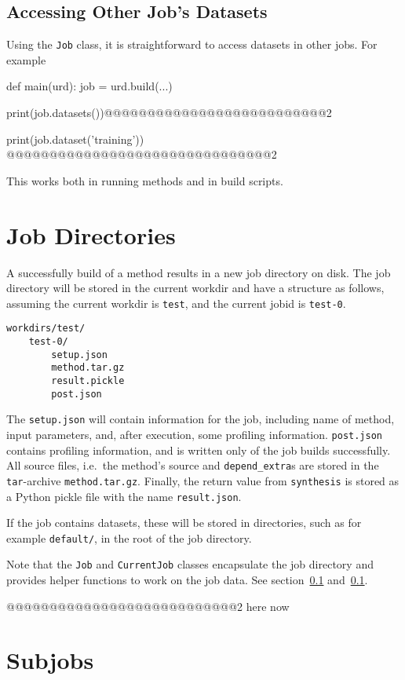 \subsection{Accessing Other Job's Datasets}
Using the \texttt{Job} class, it is straightforward to access datasets
in other jobs.  For example
\begin{python}
def main(urd):
    job = urd.build(...)

    print(job.datasets())@@@@@@@@@@@@@@@@@@@@@@@@@@2

    print(job.dataset('training')) @@@@@@@@@@@@@@@@@@@@@@@@@@@@@@@2
\end{python}
This works both in running methods and in build scripts.



\section{Job Directories}
\label{sec:job_directories}

A successfully build of a method results in a new job directory on
disk.  The job directory will be stored in the current workdir and
have a structure as follows, assuming the current workdir
is \texttt{test}, and the current jobid is \texttt{test-0}.
\begin{verbatim}
workdirs/test/
    test-0/
        setup.json
        method.tar.gz
        result.pickle
        post.json
\end{verbatim}
The \texttt{setup.json} will contain information for the job,
including name of method, input parameters, and, after execution, some
profiling information.  \texttt{post.json} contains profiling
information, and is written only of the job builds successfully.  All
source files, i.e.\ the method's source and \texttt{depend\_extra}s
are stored in the \texttt{tar}-archive \texttt{method.tar.gz}.
Finally, the return value from \texttt{synthesis} is stored as a
Python pickle file with the name \texttt{result.json}.

If the job contains datasets, these will be stored in directories,
such as for example \texttt{default/}, in the root of the job
directory.

Note that the \texttt{Job} and \texttt{CurrentJob} classes encapsulate
the job directory and provides helper functions to work on the job
data.  See section~\ref{} and~\ref{}.



@@@@@@@@@@@@@@@@@@@@@@@@@@@2 here now


\section{Subjobs}
\label{sec:subjobs}


